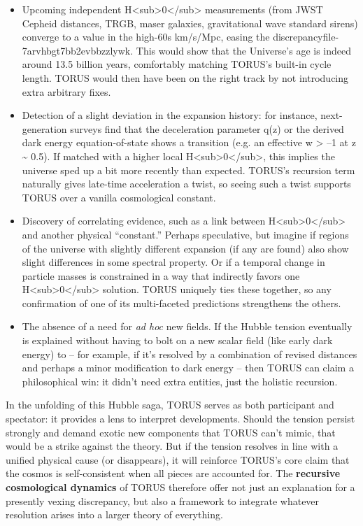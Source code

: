 \documentclass[]{article}
\begin{document}
\begin{itemize}
\item
  Upcoming independent
  H\textless{}sub\textgreater{}0\textless{}/sub\textgreater{}
  measurements (from JWST Cepheid distances, TRGB, maser galaxies,
  gravitational wave standard sirens) converge to a value in the
  high-60s km/s/Mpc, easing the discrepancy​file-7arvhbgt7bb2evbbzzlywk.
  This would show that the Universe's age is indeed around 13.5 billion
  years, comfortably matching TORUS's built-in cycle length. TORUS would
  then have been on the right track by not introducing extra arbitrary
  fixes.
\item
  Detection of a slight deviation in the expansion history: for
  instance, next-generation surveys find that the deceleration parameter
  q(z) or the derived dark energy equation-of-state shows a transition
  (e.g. an effective w \textgreater{} --1 at z \textasciitilde{} 0.5).
  If matched with a higher local
  H\textless{}sub\textgreater{}0\textless{}/sub\textgreater{}, this
  implies the universe sped up a bit more recently than expected.
  TORUS's recursion term naturally gives late-time acceleration a twist,
  so seeing such a twist supports TORUS over a vanilla cosmological
  constant.
\item
  Discovery of correlating evidence, such as a link between
  H\textless{}sub\textgreater{}0\textless{}/sub\textgreater{} and
  another physical ``constant.'' Perhaps speculative, but imagine if
  regions of the universe with slightly different expansion (if any are
  found) also show slight differences in some spectral property. Or if a
  temporal change in particle masses is constrained in a way that
  indirectly favors one
  H\textless{}sub\textgreater{}0\textless{}/sub\textgreater{} solution.
  TORUS uniquely ties these together, so any confirmation of one of its
  multi-faceted predictions strengthens the others.
\item
  The absence of a need for \emph{ad hoc} new fields. If the Hubble
  tension eventually is explained without having to bolt on a new scalar
  field (like early dark energy) to  -- for example, if it's
  resolved by a combination of revised distances and perhaps a minor
  modification to dark energy -- then TORUS can claim a philosophical
  win: it didn't need extra entities, just the holistic recursion.
\end{itemize}

In the unfolding of this Hubble saga, TORUS serves as both participant
and spectator: it provides a lens to interpret developments. Should the
tension persist strongly and demand exotic new components that TORUS
can't mimic, that would be a strike against the theory. But if the
tension resolves in line with a unified physical cause (or disappears),
it will reinforce TORUS's core claim that the cosmos is self-consistent
when all pieces are accounted for. The \textbf{recursive cosmological
dynamics} of TORUS therefore offer not just an explanation for a
presently vexing discrepancy, but also a framework to integrate whatever
resolution arises into a larger theory of everything.
\end{document}
